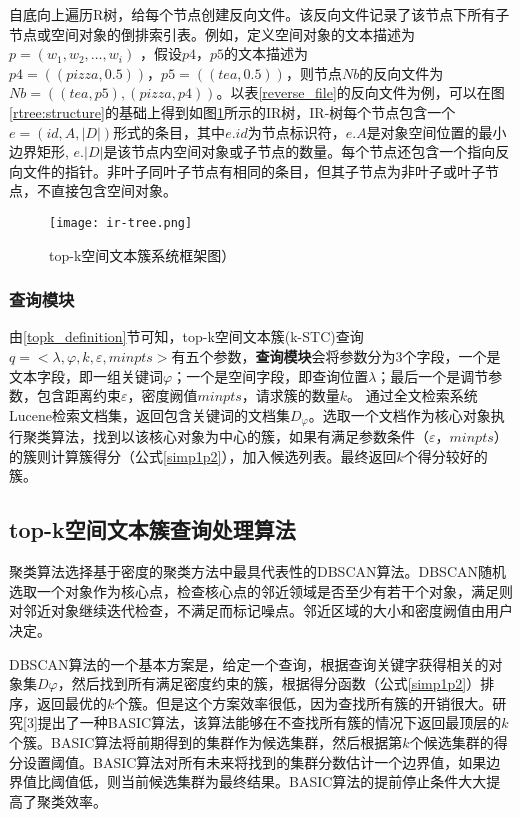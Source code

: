 自底向上遍历R树，给每个节点创建反向文件。该反向文件记录了该节点下所有子节点或空间对象的倒排索引表。例如，定义空间对象的文本描述为$p=(w_1,w_2,…,w_i)$ ，假设$p4，p5$的文本描述为$p4 = ((pizza, 0.5))，p5 = ((tea, 0.5))$，则节点$Nb$的反向文件为$Nb = ((tea, p5), (pizza, p4))$。以表\ref{reverse_file}的反向文件为例，可以在图\ref{rtree:structure}的基础上得到如图\ref{ir_tree_example}所示的IR树，IR-树每个节点包含一个$e=(id,A,|D|)$形式的条目，其中$e.id$为节点标识符，$e. A$是对象空间位置的最小边界矩形, $e. \left| D \right|$是该节点内空间对象或子节点的数量。每个节点还包含一个指向反向文件的指针。非叶子同叶子节点有相同的条目，但其子节点为非叶子或叶子节点，不直接包含空间对象。

\begin{figure}[htbp]
	\begin{center}
		\texttt{[image: ir-tree.png]}
		\caption{top-k空间文本簇系统框架图）}
		\label{ir_tree_example}
	\end{center}
\end{figure}
\subsubsection{查询模块}

由\ref{topk_definition}节可知，top-k空间文本簇(k-STC)查询$q=<\lambda, \varphi, k, \varepsilon, minpts>$有五个参数，\textbf{查询模块}会将参数分为3个字段，一个是文本字段，即一组关键词$\varphi$；一个是空间字段，即查询位置$\lambda$；最后一个是调节参数，包含距离约束$\varepsilon$，密度阙值$minpts$，请求簇的数量$k$。
通过全文检索系统Lucene检索文档集，返回包含关键词的文档集$D_\varphi$。选取一个文档作为核心对象执行聚类算法，找到以该核心对象为中心的簇，如果有满足参数条件$（\varepsilon，minpts）$的簇则计算簇得分（公式\ref{simp1p2}），加入候选列表。最终返回$k$个得分较好的簇。

\subsection{top-k空间文本簇查询处理算法}

聚类算法选择基于密度的聚类方法中最具代表性的DBSCAN算法。DBSCAN随机选取一个对象作为核心点，检查核心点的邻近领域是否至少有若干个对象，满足则对邻近对象继续迭代检查，不满足而标记噪点。邻近区域的大小和密度阙值由用户决定。

DBSCAN算法的一个基本方案是，给定一个查询，根据查询关键字获得相关的对象集$D\varphi$，然后找到所有满足密度约束的簇，根据得分函数（公式\ref{simp1p2}）排序，返回最优的$k$个簇。但是这个方案效率很低，因为查找所有簇的开销很大。研究[3]提出了一种BASIC算法，该算法能够在不查找所有簇的情况下返回最顶层的$k$个簇。BASIC算法将前期得到的集群作为候选集群，然后根据第$k$个候选集群的得分设置阈值。BASIC算法对所有未来将找到的集群分数估计一个边界值，如果边界值比阈值低，则当前候选集群为最终结果。BASIC算法的提前停止条件大大提高了聚类效率。

